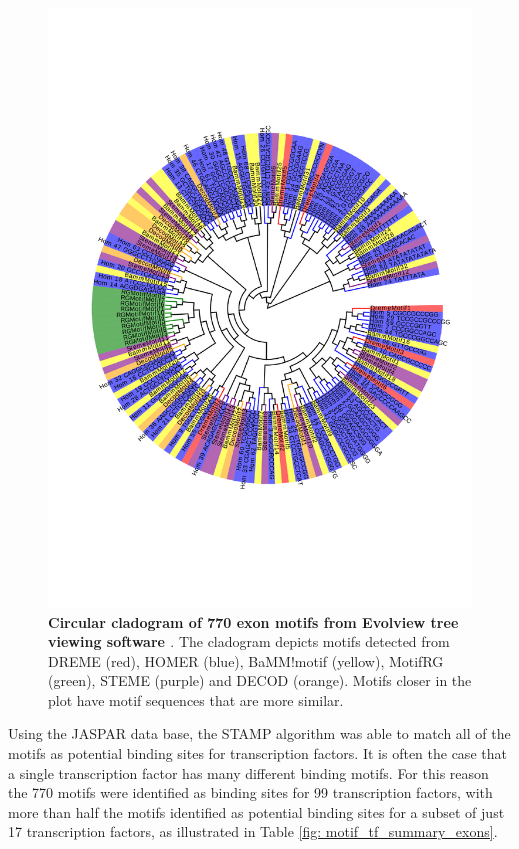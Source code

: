 \documentclass[12pt]{article}
\begin{document}
\begin{figure}[htbp] 
     \includegraphics[width= \textwidth]{exon_pilot_cardiogram.pdf} 
    \caption{{\bf Circular cladogram of 770 exon motifs from Evolview tree viewing software \citep{He2016} }. 
    The cladogram depicts motifs detected from DREME (red), HOMER (blue), BaMM!motif (yellow), MotifRG (green), STEME (purple)
    and DECOD (orange). Motifs closer in the plot have motif sequences that are more similar.}
    \label{fig: exon_cladogram}
\end{figure}

Using the JASPAR data base, the STAMP algorithm was able to match all of the motifs as potential binding sites for transcription factors. It is often the case that a single transcription factor has many different binding motifs. For this reason the 770 motifs were identified as binding sites for 99 transcription factors, with more than half the motifs identified as potential binding sites for a subset of just 17 transcription factors, as illustrated in Table \ref{fig: motif_tf_summary_exons}. 
\end{document}
